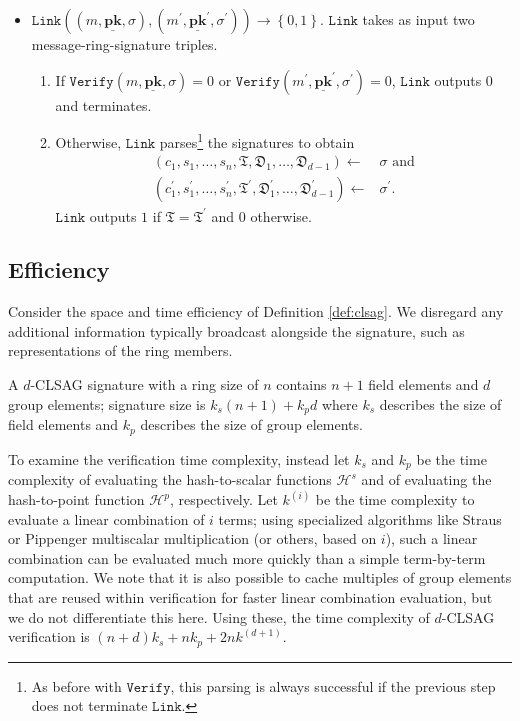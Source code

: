 \documentclass[draft]{llncs} %
\begin{document}
\begin{definition}[$d$-CLSAG]
\begin{itemize}
\item $\texttt{Link}\left((m, \underline{\textbf{pk}}, \sigma), (m^\prime, \underline{\textbf{pk}}^\prime, \sigma^\prime)\right) \to \left\{0,1\right\}$. $\texttt{Link}$ takes as input two message-ring-signature triples.
\begin{enumerate}
\item If $\texttt{Verify}(m, \underline{\textbf{pk}}, \sigma) = 0$ or $\texttt{Verify}(m^\prime, \underline{\textbf{pk}}^\prime, \sigma^\prime) = 0$, $\texttt{Link}$ outputs $0$ and terminates.

\item Otherwise, $\texttt{Link}$ parses\footnote{As before with $\texttt{Verify}$, this parsing is always successful if the previous step does not terminate $\texttt{Link}$.} the signatures to obtain
\begin{align*}
(c_1, s_1, \ldots, s_n, \mathfrak{T}, \mathfrak{D}_1, \ldots, \mathfrak{D}_{d-1}) \leftarrow&  \sigma\text{ and}\\
(c_1^\prime, s_1^\prime, \ldots, s_n^\prime, \mathfrak{T}^\prime, \mathfrak{D}_1^\prime, \ldots, \mathfrak{D}_{d-1}^\prime) \leftarrow& \sigma^\prime.
\end{align*} $\texttt{Link}$ outputs $1$ if $\mathfrak{T} = \mathfrak{T}^\prime$ and $0$ otherwise.
\end{enumerate}
\end{itemize}
\end{definition}


\subsection{Efficiency}\label{sec:efficiency}
Consider the space and time efficiency of Definition \ref{def:clsag}. We disregard any additional information typically broadcast alongside the signature, such as representations of the ring members.

A $d$-CLSAG signature with a ring size of $n$ contains $n+1$ field elements and $d$ group elements; signature size is $k_s(n+1) + k_p d$ where $k_s$ describes the size of field elements and $k_p$ describes the size of group elements.

To examine the verification time complexity, instead let $k_s$ and $k_p$ be the time complexity of evaluating the hash-to-scalar functions $\mathcal{H}^s$ and of evaluating the hash-to-point function $\mathcal{H}^p$, respectively. Let $k^{(i)}$ be the time complexity to evaluate a linear combination of $i$ terms; using specialized algorithms like Straus \cite{straus} or Pippenger \cite{pippenger} multiscalar multiplication (or others, based on $i$), such a linear combination can be evaluated much more quickly than a simple term-by-term computation. We note that it is also possible to cache multiples of group elements that are reused within verification for faster linear combination evaluation, but we do not differentiate this here. Using these, the time complexity of $d$-CLSAG verification is $(n+d)k_s + nk_p + 2nk^{(d+1)}$.
\end{document}
